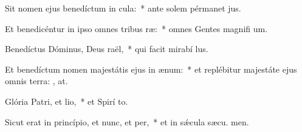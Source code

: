 \item Sit nomen ejus benedíctum in cula:~* ante solem pérmanet  jus.
\item Et benedicéntur in ipso omnes tribus ræ:~* omnes Gentes magnifi um.
\item Benedíctus Dóminus, Deus raël,~* qui facit mirabí lus.
\item Et benedíctum nomen majestátis ejus in ænum:~* et replébitur majestáte ejus omnis terra: , at.
\item Glória Patri, et lio,~* et Spirí to.
\item Sicut erat in princípio, et nunc, et per,~* et in sǽcula sæcu. men.
